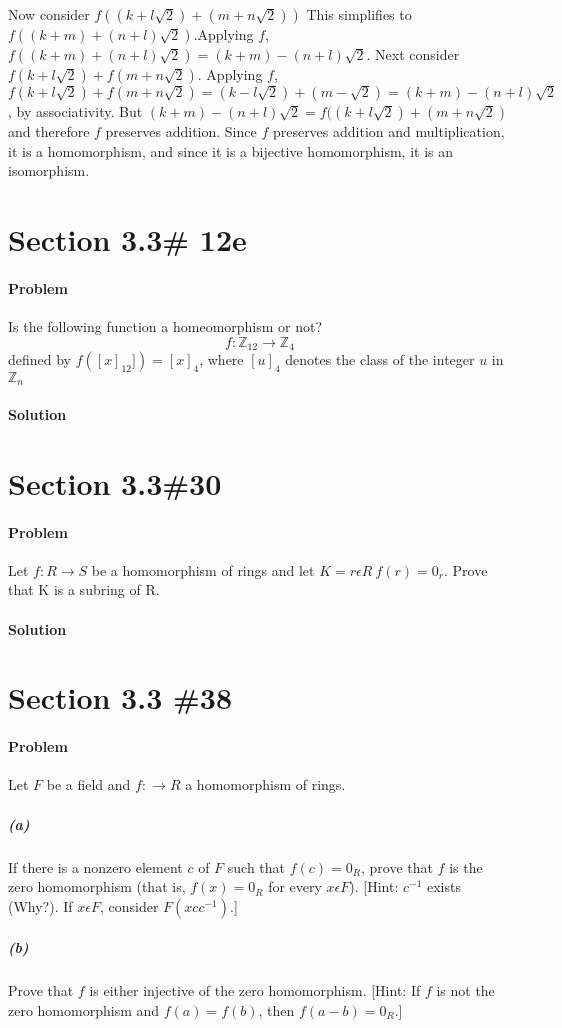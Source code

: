 \documentclass[a4paper,11pt]{article}
\begin{document}
Now consider $f((k+l\sqrt{2}) + (m + n\sqrt{2}))$ This simplifies to $f((k+m) + (n+l)\sqrt{2})$.Applying $f$, $f((k+m) + (n+l)\sqrt{2}) = (k+m) - (n+l)\sqrt{2}$.  Next consider $f(k + l\sqrt{2}) + f(m + n\sqrt{2})$. Applying $f$, $f(k + l\sqrt{2}) + f(m + n\sqrt{2}) = (k-l\sqrt{2}) + (m-\sqrt{2}) = (k+m) - (n+l)\sqrt{2}$, by associativity. But $(k+m) - (n+l)\sqrt{2} = f((k+l\sqrt{2}) + (m+n\sqrt{2})$ and therefore $f$ preserves addition.
 Since $f$ preserves addition and multiplication, it is a homomorphism, and since it is a bijective homomorphism, it is an isomorphism.

\section{Section 3.3\# 12e}
\paragraph{Problem} Is the following function a homeomorphism or not?
\begin{equation}
f: \mathbb{Z}_{12} \rightarrow \mathbb{Z}_4 
\end{equation}
defined by $f([x]_{12}]) = [x]_4$, where $[u]_4$ denotes the class of the integer $u$ in $\mathbb{Z}_n$
\paragraph{Solution}

\section{Section 3.3\#30}
\paragraph{Problem}
Let $f:R\rightarrow S$ be a homomorphism of rings and let $K = {r\epsilon R \: f(r) = 0_r}$.
Prove that K is a subring of R.
\paragraph{Solution}

\section{Section 3.3 \#38}
\paragraph{Problem}
Let $F$ be a field and $f: \rightarrow R$ a homomorphism of rings.
\subparagraph{(a)}
If there is a nonzero element $c$ of $F$ such that $f(c) = 0_R$, prove that $f$ is the zero homomorphism (that is, $f(x) = 0_R$ for every $x \epsilon F$). [Hint: $c^{-1}$ exists (Why?). If $x \epsilon F$, consider $F(xcc^{-1})$.]
\subparagraph{(b)}
Prove that $f$ is either injective of the zero homomorphism. [Hint: If $f$ is not the zero homomorphism and $f(a)= f(b)$, then $f(a-b) = 0_R$.]
\end{document}
